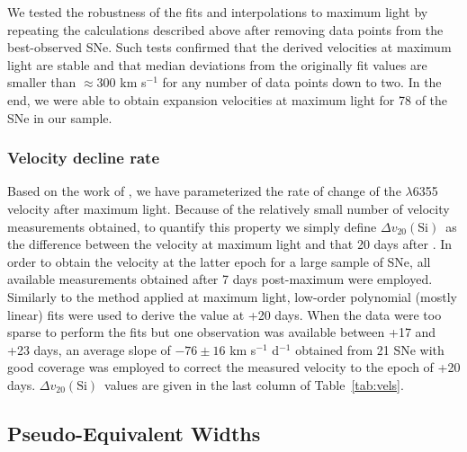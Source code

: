 \documentclass[apj]{emulateapj-rtx4}
\newcommand{\deltav}{$\Delta v_{20}(\mathrm{Si})$}
\begin{document}
We tested the robustness of the fits and interpolations to
maximum light by repeating the calculations described above after
removing data points from the best-observed SNe. Such tests
confirmed that the derived velocities at maximum light are stable
and that median deviations from the originally fit values are
smaller than $\approx$300 km s$^{-1}$ for any number of data points
down to two. In the end, we were able to
obtain expansion velocities at maximum light for 78 of the
SNe in our sample.

\subsubsection{Velocity decline rate}
\label{sec:dv}

Based on the work of \citet{benetti05}, we have parameterized the rate of
change of the  $\lambda$6355 velocity after maximum
light. Because of the relatively small number of velocity measurements
obtained, to quantify this property we simply define \deltav\ as
the difference between the velocity at maximum light and that 20 days
after \citep[see a discussion on the difficulty of measuring velocity
  gradients in][]{blondin12}. In order to obtain the velocity at the latter epoch for a large
sample of SNe, all available measurements obtained after 7 days
post-maximum were employed. Similarly to the method applied at maximum
light, low-order polynomial (mostly linear) fits were used to derive
the value at +20 days. When the data were too sparse to perform the
fits but one observation was available between +17 and +23 days, an
average slope of $-76 \pm 16$ km s$^{-1}$ d$^{-1}$ 
obtained from 21 SNe with good coverage was employed to correct the
measured velocity to the epoch of +20 days. \deltav\ values are given
in the last column of Table~\ref{tab:vels}.

\subsection{Pseudo-Equivalent Widths}
\label{sec:ew}
\end{document}
